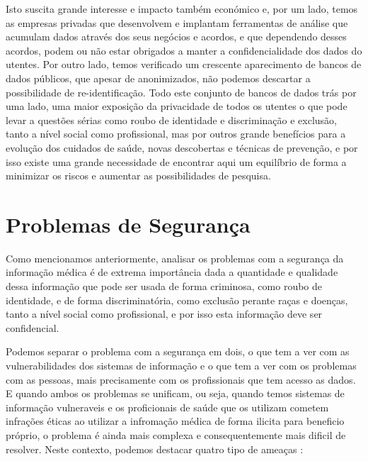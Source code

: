 \documentclass[conference]{IEEEtran}
\begin{document}
Isto suscita grande interesse e impacto também económico e, por um lado, temos as empresas privadas que desenvolvem e implantam ferramentas de análise que acumulam dados através dos seus negócios e acordos, e que dependendo desses acordos, podem ou não estar obrigados a manter a confidencialidade dos dados do utentes. Por outro lado, temos verificado um crescente aparecimento de bancos de dados públicos, que apesar de anonimizados, não podemos descartar a possibilidade de re-identificação. Todo este conjunto de bancos de dados trás por uma lado, uma maior exposição da privacidade de todos os utentes o que pode levar a questões sérias como roubo de identidade e discriminação e exclusão, tanto a nível social como profissional, mas por outros grande benefícios para a evolução dos cuidados de saúde, novas descobertas e técnicas de prevenção, e por isso existe uma grande necessidade de encontrar aqui um equilíbrio de forma a minimizar os riscos e aumentar as possibilidades de pesquisa.



\section{Problemas de Segurança}	\label{probseg}

Como mencionamos anteriormente, analisar os problemas com a segurança da informação médica é de extrema importância dada a quantidade e qualidade dessa informação que pode ser usada de forma criminosa, como roubo de identidade, e de forma discriminatória, como exclusão perante raças e doenças, tanto a nível social como profissional, e por isso esta informação deve ser confidencial.

Podemos separar o problema com a segurança em dois, o que tem a ver com as vulnerabilidades dos sistemas de informação e o que tem a ver com os problemas com as pessoas, mais precisamente com os profissionais que tem acesso as dados.
E quando ambos os problemas se unificam, ou seja, quando temos sistemas de informação vulneraveis e os proficionais de saúde que os utilizam cometem infrações éticas ao utilizar a infromação médica de forma ilicita para beneficio próprio, o problema é ainda mais complexa e consequentemente mais dificil de resolver. Neste contexto, podemos destacar quatro tipo de ameaças \cite{kayarkar2012classification}:
\end{document}
